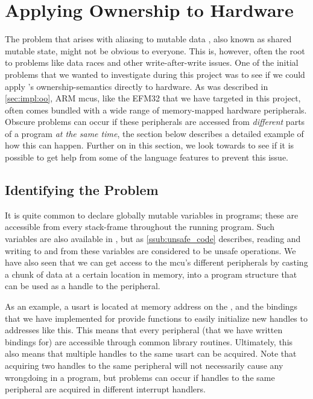 
\section{Applying Ownership to Hardware}
\label{sec:ownership_allied_to_hardware}

The problem that arises with aliasing to mutable data \cite{web:problem_with_shared_mutability}, also known as shared mutable state, might not be obvious to everyone.
This is, however, often the root to problems like data races and other write-after-write issues.
One of the initial problems that we wanted to investigate during this project was to see if we could apply {\rust}'s ownership-semantics directly to hardware.
As was described in \autoref{sec:impl:oo}, ARM \glspl{mcu}, like the EFM32 that we have targeted in this project, often comes bundled with a wide range of memory-mapped hardware peripherals.
Obscure problems can occur if these peripherals are accessed from \emph{different} parts of a program \emph{at the same time}, the section below describes a detailed example of how this can happen.
Further on in this section, we look towards {\rust} to see if it is possible to get help from some of the language features to prevent this issue.

\subsection{Identifying the Problem}

It is quite common to declare globally mutable variables in {\C} programs; these are accessible from every stack-frame throughout the running program.
Such variables are also available in {\rust}, but as \autoref{ssub:unsafe_code} describes, reading and writing to and from these variables are considered to be unsafe operations.
We have also seen that we can get access to the \gls{mcu}'s different peripherals by casting a chunk of data at a certain location in memory, into a program structure that can be used as a handle to the peripheral.

As an example, a \gls{usart} is located at memory address  on the {\gecko}, and the bindings that we have implemented for {\emlib} provide functions to easily initialize new handles to addresses like this.
This means that every peripheral (that we have written bindings for) are accessible through common library routines.
Ultimately, this also means that multiple handles to the same \gls{usart} can be acquired.
Note that acquiring two handles to the same peripheral will not necessarily cause any wrongdoing in a program, but problems can occur if handles to the same peripheral are acquired in different interrupt handlers.

